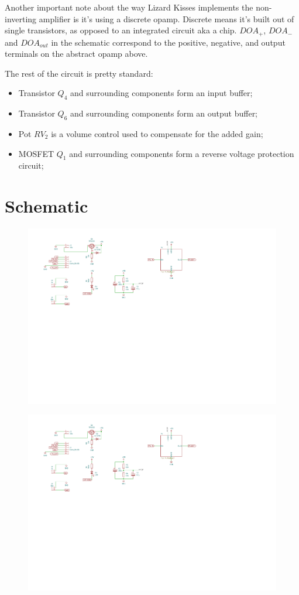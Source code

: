 \documentclass[a4paper,12pt]{article}
\begin{document}
Another important note about the way Lizard Kisses
implements the non-inverting amplifier is it's using a
discrete opamp. Discrete means it's built out of single
transistors, as opposed to an integrated circuit aka a chip.
$DOA_+$, $DOA_-$ and $DOA_{out}$ in the schematic correspond
to the positive, negative, and output terminals on the
abstract opamp above.

The rest of the circuit is pretty standard:

\begin{itemize}
  \item Transistor $Q_4$ and surrounding components form an
    input buffer;
  \item Transistor $Q_6$ and surrounding components form an
    output buffer;
  \item Pot $RV_2$ is a volume control used to compensate
    for the added gain;
  \item MOSFET $Q_1$ and surrounding components form a
    reverse voltage protection circuit;
\end{itemize}

\pagebreak

\section{Schematic}
\label{sec:schematic}

\begin{figure}[h!]
  \centering
  \includegraphics[width=1.3\textwidth, trim={0 10cm 6cm 0cm}, clip, angle=-90]{schem.pdf}
\end{figure}

\begin{figure}[h!]
  \centering
  \includegraphics[width=1.3\textwidth, trim={0 4cm 0cm 0cm}, page=2, clip, angle=-90]{schem.pdf}
\end{figure}
\end{document}
